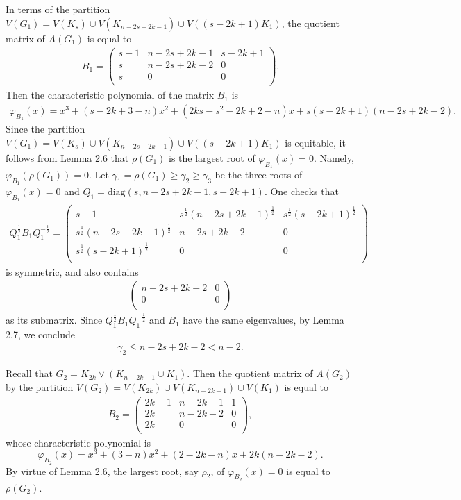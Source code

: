 \documentclass[10pt]{article}
\numberwithin{equation}{section}
\begin{document}
In terms of the partition $V(G_1)=V(K_s)\cup V(K_{n-2s+2k-1})\cup V((s-2k+1)K_1)$, the quotient matrix of $A(G_1)$ is equal to
\begin{align*}
B_1=\left(
  \begin{array}{ccc}
    s-1 & n-2s+2k-1 & s-2k+1\\
    s & n-2s+2k-2 & 0\\
    s & 0 & 0\\
  \end{array}
\right).
\end{align*}
Then the characteristic polynomial of the matrix $B_1$ is
\begin{align*}
\varphi_{B_1}(x)=x^{3}+(s-2k+3-n)x^{2}+(2ks-s^{2}-2k+2-n)x+s(s-2k+1)(n-2s+2k-2).
\end{align*}
Since the partition $V(G_1)=V(K_s)\cup V(K_{n-2s+2k-1})\cup V((s-2k+1)K_1)$ is equitable, it follows from Lemma 2.6 that $\rho(G_1)$ is the largest
root of $\varphi_{B_1}(x)=0$. Namely, $\varphi_{B_1}(\rho(G_1))=0$. Let $\gamma_1=\rho(G_1)\geq\gamma_2\geq\gamma_3$ be the three roots of $\varphi_{B_1}(x)=0$
and $Q_1=\mbox{diag}(s,n-2s+2k-1,s-2k+1)$. One checks that
\begin{align*}
Q_1^{\frac{1}{2}}B_1Q_1^{-\frac{1}{2}}=\left(
  \begin{array}{ccc}
    s-1 & s^{\frac{1}{2}}(n-2s+2k-1)^{\frac{1}{2}} & s^{\frac{1}{2}}(s-2k+1)^{\frac{1}{2}}\\
    s^{\frac{1}{2}}(n-2s+2k-1)^{\frac{1}{2}} & n-2s+2k-2 & 0\\
    s^{\frac{1}{2}}(s-2k+1)^{\frac{1}{2}} & 0 & 0\\
  \end{array}
\right)
\end{align*}
is symmetric, and also contains
\begin{align*}
\left(
  \begin{array}{ccc}
    n-2s+2k-2 & 0\\
    0 & 0\\
  \end{array}
\right)
\end{align*}
as its submatrix. Since $Q_1^{\frac{1}{2}}B_1Q_1^{-\frac{1}{2}}$ and $B_1$ have the same eigenvalues, by Lemma 2.7, we conclude
\begin{align}\label{eq:4.2}
\gamma_2\leq n-2s+2k-2<n-2.
\end{align}

Recall that $G_2=K_{2k}\vee(K_{n-2k-1}\cup K_1)$. Then the quotient matrix of $A(G_2)$ by the partition $V(G_2)=V(K_{2k})\cup V(K_{n-2k-1})\cup V(K_1)$
is equal to
\begin{align*}
B_2=\left(
  \begin{array}{ccc}
    2k-1 & n-2k-1 & 1\\
    2k & n-2k-2 & 0\\
    2k & 0 & 0\\
  \end{array}
\right),
\end{align*}
whose characteristic polynomial is
$$
\varphi_{B_2}(x)=x^{3}+(3-n)x^{2}+(2-2k-n)x+2k(n-2k-2).
$$
By virtue of Lemma 2.6, the largest root, say $\rho_2$, of $\varphi_{B_2}(x)=0$ is equal to $\rho(G_2)$.
\end{document}

